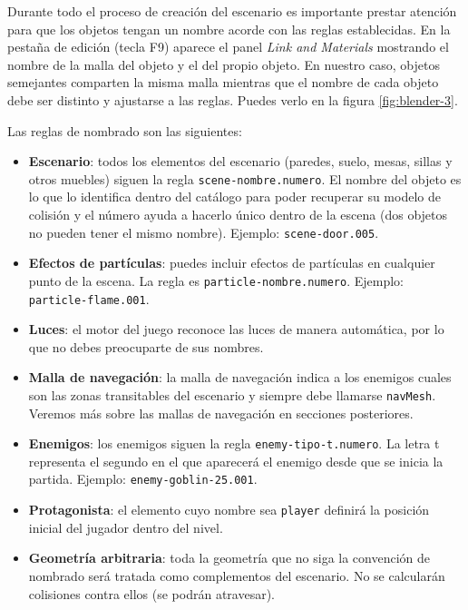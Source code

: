 \documentclass[a4paper,11pt]{article}
\begin{document}
Durante todo el proceso de creación del escenario es importante prestar
atención para que los objetos tengan un nombre acorde con las reglas
establecidas. En la pestaña de edición (tecla F9) aparece el panel
\textit{Link and Materials} mostrando el nombre de la malla del objeto
y el del propio objeto. En nuestro caso, objetos semejantes comparten
la misma malla mientras que el nombre de cada objeto debe ser distinto
y ajustarse a las reglas. Puedes verlo en la figura \ref{fig:blender-3}.


Las reglas de nombrado son las siguientes:

\begin{itemize}
    \itemsep0em
    \item \textbf{Escenario}: todos los elementos del escenario (paredes,
    suelo, mesas, sillas y otros muebles) siguen la regla \texttt{scene-nombre.numero}.
    El nombre del objeto es lo que lo identifica dentro del catálogo para poder
    recuperar su modelo de colisión y el número ayuda a hacerlo único dentro de la
    escena (dos objetos no pueden tener el mismo nombre). Ejemplo: \texttt{scene-door.005}.
    \item \textbf{Efectos de partículas}: puedes incluir efectos de partículas
    en cualquier punto de la escena. La regla es \texttt{particle-nombre.numero}.
    Ejemplo: \texttt{particle-flame.001}.
    \item \textbf{Luces}: el motor del juego reconoce las luces de manera automática,
    por lo que no debes preocuparte de sus nombres.
    \item \textbf{Malla de navegación}: la malla de navegación indica a los
    enemigos cuales son las zonas transitables del escenario y siempre
    debe llamarse \texttt{navMesh}. Veremos más sobre las mallas de navegación
    en secciones posteriores.
    \item \textbf{Enemigos}: los enemigos siguen la regla \texttt{enemy-tipo-t.numero}.
    La letra t representa el segundo en el que aparecerá el enemigo desde
    que se inicia la partida. Ejemplo: \texttt{enemy-goblin-25.001}.
    \item \textbf{Protagonista}: el elemento cuyo nombre sea \texttt{player}
    definirá la posición inicial del jugador dentro del nivel.
    \item \textbf{Geometría arbitraria}: toda la geometría que no siga
    la convención de nombrado será tratada como complementos del escenario.
    No se calcularán colisiones contra ellos (se podrán atravesar).
\end{itemize}
\end{document}
